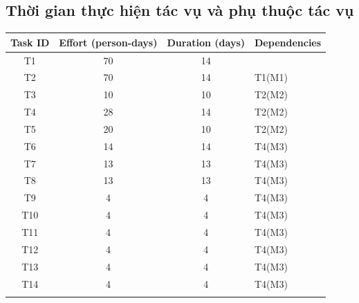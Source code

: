 \documentclass[a4paper, 12pt]{article}
\begin{document}
    \subsection{Thời gian thực hiện tác vụ và phụ thuộc tác vụ}
    \begin{table}[H]
        \begin{center}
            \begin{tabular}{|c|c|c|l|}
            \hline
            Task ID & Effort (person-days) & Duration (days) & \multicolumn{1}{c|}{Dependencies}                               \\ \hline \rowcolor[HTML]{E6B8AF} 
            T1      & 70                   & 14              & \\ \hline \rowcolor[HTML]{EAD1DC} 
            T2      & 70                   & 14              &T1(M1) \\ \hline \rowcolor[HTML]{D9EAD3} 
            T3      & 10                   & 10              &T2(M2) \\ \hline \rowcolor[HTML]{D9EAD3} 
            T4      & 28                   & 14              &T2(M2) \\ \hline \rowcolor[HTML]{D9EAD3} 
            T5      & 20                   & 10              &T2(M2) \\ \hline \rowcolor[HTML]{FFFFFF} 
            T6      & 14                   & 14              &T4(M3) \\ \hline \rowcolor[HTML]{FFFFFF} 
            T7      & 13                   & 13              &T4(M3) \\ \hline \rowcolor[HTML]{FFFFFF} 
            T8      & 13                   & 13              &T4(M3) \\ \hline \rowcolor[HTML]{FFFFFF} 
            T9      & 4                    & 4               &T4(M3) \\ \hline \rowcolor[HTML]{FFFFFF} 
            T10     & 4                    & 4               &T4(M3) \\ \hline \rowcolor[HTML]{FFFFFF} 
            T11     & 4                    & 4               &T4(M3) \\ \hline \rowcolor[HTML]{FFFFFF} 
            T12     & 4                    & 4               &T4(M3) \\ \hline \rowcolor[HTML]{FFFFFF} 
            T13     & 4                    & 4               &T4(M3) \\ \hline \rowcolor[HTML]{FFFFFF} 
            T14     & 4                    & 4               &T4(M3) \\ \hline \rowcolor[HTML]{C9DAF8} 

\end{tabular}
\end{center}
\end{table}
\end{document}
